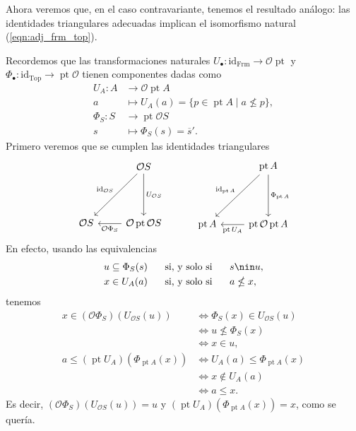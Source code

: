 \documentclass[12pt,letterpaper,titlepage]{article}
\theoremstyle{definition}
\newcommand\ol[1]{\overline{#1}}
\renewcommand\cal[1]{\mathcal{#1}}
\newcommand\ssi{\hspace{5mm}\text{ si, y solo si }\hspace{5mm}}
\newcommand\<{\langle}
\renewcommand\>{\rangle}
\newcommand{\Frm}{\mathrm{Frm}}
\newcommand{\Top}{\mathrm{Top}}
\newcommand{\id}{\mathrm{id}}
\DeclareMathOperator{\pt}{pt}
\begin{document}
Ahora veremos que, en el caso contravariante,
tenemos el resultado análogo:
las identidades triangulares adecuadas
implican el isomorfismo natural (\ref{eqn:adj_frm_top}).

Recordemos que las transformaciones naturales
$U_\bullet:\id_\Frm\to\cal O\pt$ y
$\Phi_\bullet:\id_\Top\to\pt\cal O$
tienen componentes dadas como
\begin{align*}
    U_A:A&\to \cal O\pt A \\
    a &\mapsto U_A(a) = \{p\in \pt A \mid a\nleq p\}, \\
    \Phi_S:S&\to \pt\cal O S \\
    s &\mapsto \Phi_S(s)=\ol{s}'.
\end{align*}
Primero veremos que se cumplen las identidades triangulares
\[
    \begin{tikzcd}[row sep=15mm]
        & \cal OS \ar[d,"U_{\cal OS}"] \ar[dl,"\id_{\cal OS}"']
        \\
        \cal OS
        & \cal O\pt\cal OS \ar[l,"\cal O\Phi_S"]
    \end{tikzcd}
    \hspace{10mm}
    \begin{tikzcd}[row sep=15mm]
        & \pt A \ar[d,"\Phi_{\pt A}"] \ar[dl,"\id_{\pt A}"']
        \\
        \pt A
        & \pt \cal O\pt A \ar[l,"\pt U_A"]
    \end{tikzcd}
\]
En efecto, usando las equivalencias
\begin{align*}
    u\subseteq \Phi_S(s) &\ssi s\nin u, \\
    x\in U_A(a) &\ssi a\nleq x,
\end{align*}
tenemos
\begin{align*}
    x\in (\cal O\Phi_S)(U_{\cal OS}(u))
    &\iff \Phi_S(x) \in U_{\cal OS}(u) \\
    &\iff u\nleq \Phi_S(x) \\
    &\iff x\in u,
    \\
    a\leq (\pt U_A)(\Phi_{\pt A}(x))
    &\iff U_A(a) \leq \Phi_{\pt A}(x) \\
    &\iff x\nin U_A(a) \\
    &\iff a\leq x.
\end{align*}
Es decir, $(\cal O\Phi_S)(U_{\cal OS}(u))=u$
y $(\pt U_A)(\Phi_{\pt A}(x))=x$, como se quería.
\end{document}
